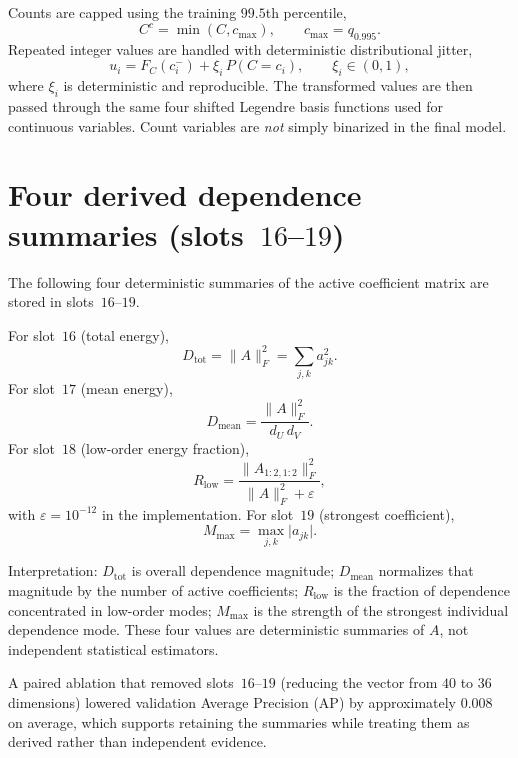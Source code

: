 Counts are capped using the training $99.5$th percentile,
\begin{equation}
\label{eq:app-count-cap}
C^{c}=\min(C,c_{\max}),\qquad c_{\max}=q_{0.995}.
\end{equation}
Repeated integer values are handled with deterministic distributional jitter,
\begin{equation}
\label{eq:app-jitter}
u_{i}=F_{C}(c_{i}^{-})+\xi_{i}\,P(C=c_{i}),\qquad \xi_{i}\in(0,1),
\end{equation}
where $\xi_{i}$ is deterministic and reproducible.
The transformed values are then passed through the same four shifted Legendre basis functions used for continuous variables.
Count variables are \emph{not} simply binarized in the final model.

\section{Four derived dependence summaries (slots~$16$--$19$)}
\label{app:hcr-summaries}

The following four deterministic summaries of the active coefficient matrix are stored in slots~$16$--$19$.

For slot~$16$ (total energy),
\begin{equation}
D_{\mathrm{tot}}=\|A\|_{F}^{2}=\sum_{j,k}a_{jk}^{2}.
\end{equation}
For slot~$17$ (mean energy),
\begin{equation}
D_{\mathrm{mean}}=\frac{\|A\|_{F}^{2}}{d_{U}\,d_{V}}.
\end{equation}
For slot~$18$ (low-order energy fraction),
\begin{equation}
R_{\mathrm{low}}
=
\frac{\|A_{1:2,1:2}\|_{F}^{2}}{\|A\|_{F}^{2}+\varepsilon},
\end{equation}
with $\varepsilon=10^{-12}$ in the implementation.
For slot~$19$ (strongest coefficient),
\begin{equation}
M_{\max}=\max_{j,k}\lvert a_{jk}\rvert.
\end{equation}

Interpretation:
$D_{\mathrm{tot}}$ is overall dependence magnitude;
$D_{\mathrm{mean}}$ normalizes that magnitude by the number of active coefficients;
$R_{\mathrm{low}}$ is the fraction of dependence concentrated in low-order modes;
$M_{\max}$ is the strength of the strongest individual dependence mode.
These four values are deterministic summaries of $A$, not independent statistical estimators.

A paired ablation that removed slots~$16$--$19$ (reducing the vector from $40$ to $36$ dimensions) lowered validation Average Precision (AP) by approximately $0.008$ on average, which supports retaining the summaries while treating them as derived rather than independent evidence.

